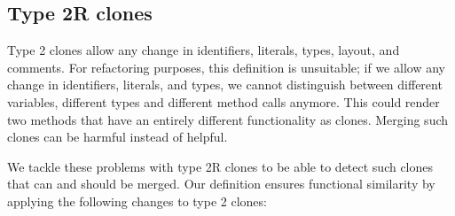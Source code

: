 \documentclass[a4paper]{article}
\begin{document}
\subsection{Type 2R clones}
Type 2 clones allow any change in identifiers, literals, types, layout, and comments. For refactoring purposes, this definition is unsuitable; if we allow any change in identifiers, literals, and types, we cannot distinguish between different variables, different types and different method calls anymore. This could render two methods that have an entirely different functionality as clones. Merging such clones can be harmful instead of helpful.

We tackle these problems with type 2R clones to be able to detect such clones that can and should be merged. Our definition ensures functional similarity by applying the following changes to type 2 clones:
\end{document}
